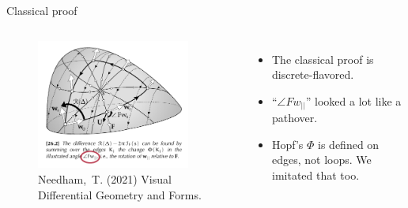 \documentclass[14pt,aspectratio=169]{beamer}
\begin{document}
\begin{frame}{Classical proof}
\begin{columns}
\vspace{12pt}
\begin{figure}
\includegraphics[width=0.9\textwidth]{figs/needham_triangle_circ.pdf}
\caption{{Needham,~T. (2021) Visual Differential Geometry and Forms.}}
\end{figure}
\vspace{-12pt}
\begin{itemize}
\item The classical proof is discrete-flavored.
\item ``\( \angle Fw_{||} \)'' looked a lot like a pathover.
\item Hopf's \( \Phi \) is defined on edges, not loops. We imitated that too.
\end{itemize}
\end{columns}
\end{frame}
\end{document}
